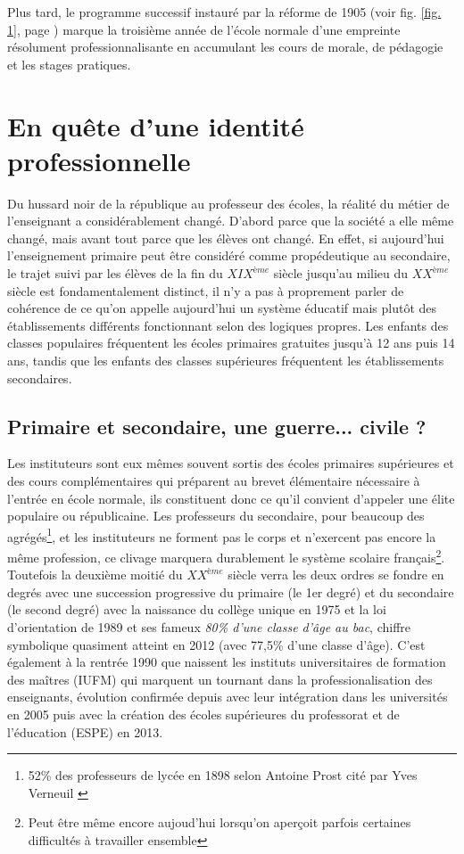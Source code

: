 \documentclass[a4paper,11pt]{article}
\begin{document}
			Plus tard, le programme successif instauré par la réforme de 1905 (voir fig. \ref{fig. 1}, page \pageref{fig. 1} ) marque la troisième année de l'école normale d'une empreinte résolument professionnalisante en accumulant les cours de morale, de pédagogie et les stages pratiques.
			
\section{En quête d'une identité professionnelle}
Du hussard noir de la république au professeur des écoles, la réalité du métier de l'enseignant a considérablement changé. D'abord parce que la société a elle même changé, mais avant tout parce que les élèves ont changé. En effet, si aujourd'hui l'enseignement primaire peut être considéré comme propédeutique au secondaire, le trajet suivi par les élèves de la fin du $XIX^{ème}$ siècle jusqu'au milieu du $XX^{ème}$ siècle est fondamentalement distinct, il n'y a pas à proprement parler de cohérence de ce qu'on appelle aujourd'hui un système éducatif mais plutôt des établissements différents fonctionnant selon des logiques propres. Les enfants des classes populaires fréquentent les écoles primaires gratuites jusqu'à 12 ans puis 14 ans, tandis que les enfants des classes supérieures fréquentent les établissements secondaires.  
			
			\subsection{Primaire et secondaire, une guerre... civile ?}
			Les instituteurs sont eux mêmes souvent sortis des écoles primaires supérieures et des cours complémentaires qui préparent au brevet élémentaire nécessaire à l'entrée en école normale, ils constituent donc ce qu'il convient d'appeler une élite populaire ou républicaine. Les professeurs du secondaire, pour beaucoup des agrégés\footnote{52\% des professeurs de lycée en 1898 selon Antoine Prost cité par Yves Verneuil \cite{ver04}}, et les instituteurs ne forment pas le corps et n'exercent pas encore la même profession, ce clivage marquera durablement le système scolaire français\footnote{Peut être même encore aujoud'hui lorsqu'on aperçoit parfois certaines difficultés à travailler ensemble}. Toutefois la deuxième moitié du $XX^{ème}$ siècle verra les deux ordres se fondre en degrés avec une succession progressive du primaire (le 1er degré) et du secondaire (le second degré) avec la naissance du collège unique en 1975 et la loi d'orientation de 1989 et ses fameux \emph{80\% d'une classe d'âge au bac}, chiffre symbolique quasiment atteint en 2012 (avec 77,5\% d'une classe d'âge). C'est également à la rentrée 1990 que naissent les instituts universitaires de formation des maîtres (IUFM) qui marquent un tournant dans la professionalisation des enseignants, évolution confirmée depuis avec leur intégration dans les universités en 2005 puis avec la création des écoles supérieures du professorat et de l'éducation (ESPE) en 2013.
			
\end{document}
